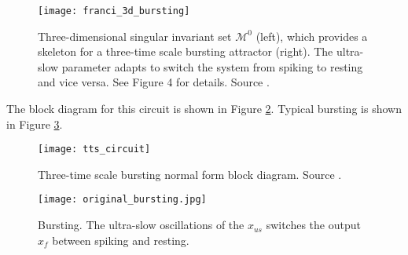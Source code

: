 \documentclass[a4paper, 12pt]{article}
\begin{document}
\begin{figure}[h!]
\texttt{[image: franci\_3d\_bursting]}
\caption{Three-dimensional singular invariant set $\mathcal{M}^0$ (left), which provides a skeleton for a three-time scale bursting attractor (right). The ultra-slow parameter adapts to switch the system from spiking to resting and vice versa. See \cite{franci2} Figure 4 for details. Source \cite{franci2}.}
\label{fig:3d_bursting}
\end{figure}

The block diagram for this circuit is shown in Figure \ref{fig:ttsbursting_circuit}. Typical bursting is shown in Figure \ref{fig:bursting_typical_oscillations}. 

\begin{figure}[h!]
\texttt{[image: tts\_circuit]}
\caption{Three-time scale bursting normal form block diagram. Source \cite{franci}.}
\label{fig:ttsbursting_circuit}
\end{figure}

 \begin{figure}[h!]
\texttt{[image: original\_bursting.jpg]}
\caption{Bursting. The ultra-slow oscillations of the $x_{us}$ switches the output $x_f$ between spiking and resting.}
\label{fig:bursting_typical_oscillations}
\end{figure}
\end{document}
